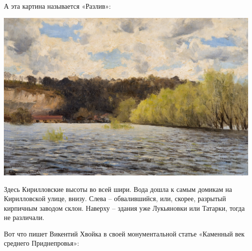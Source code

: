 А эта картина называется «Разлив»:

\begin{center}
\includegraphics[width=\linewidth]{chast-kirvys/svetosl/sveto-razliv.jpg}
\end{center}

Здесь Кирилловские высоты во всей шири. Вода дошла к самым домикам на Кирилловской улице, внизу. Слева – обвалившийся, или, скорее, разрытый кирпичным заводом склон. Наверху – здания уже Лукьяновки или Татарки, тогда не различали.

Вот что пишет Викентий Хвойка в своей монументальной статье «Каменный век среднего Приднепровья»:

